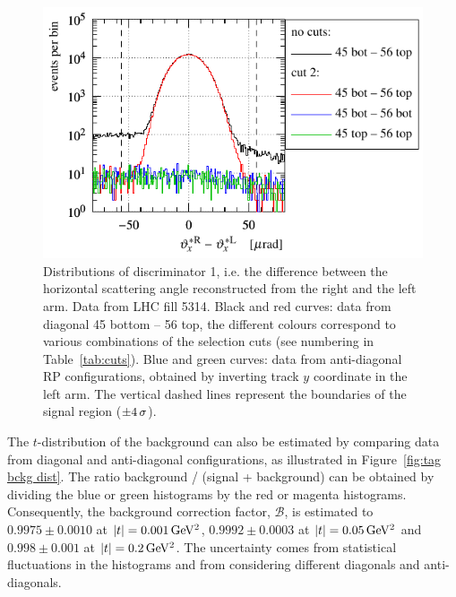 \begin{figure}
\begin{center}
\includegraphics{fig/cut_dist_antidgn_cmp.pdf}
\caption{%
Distributions of discriminator 1, i.e. the difference between the horizontal scattering angle reconstructed from the right and the left arm. Data from LHC fill 5314. Black and red curves: data from diagonal 45 bottom -- 56 top, the different colours correspond to various combinations of the selection cuts (see numbering in Table~\ref{tab:cuts}). Blue and green curves: data from anti-diagonal RP configurations, obtained by inverting track $y$ coordinate in the left arm. The vertical dashed lines represent the boundaries of the signal region ($\pm 4\,{\rm \sigma}$).
}
\label{fig:tag bckg integ}
\end{center}
\end{figure}

The $t$-distribution of the background can also be estimated by comparing data from diagonal and anti-diagonal configurations, as illustrated in Figure~\ref{fig:tag bckg dist}. The ratio background / (signal + background) can be obtained by dividing the blue or green histograms by the red or magenta histograms. Consequently, the background correction factor, $\mathcal{B}$, is estimated to $0.9975 \pm 0.0010$ at $|t| = 0.001\,{\rm GeV^2}$, $0.9992 \pm 0.0003$ at $|t| = 0.05\,{\rm GeV^2}$ and $0.998 \pm 0.001$ at $|t| = 0.2\,{\rm GeV^2}$. The uncertainty comes from statistical fluctuations in the histograms and from considering different diagonals and anti-diagonals.

